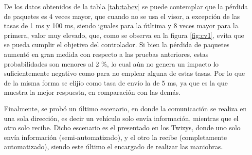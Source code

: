 \begin{table}[htbp]
  \centering
{}%
  \caption{Prueba del sistema de comunicación a distintas tasas de envío empleando el Visor 3D}
  \label{tab:tabcv}%
\end{table}%

\par De los datos obtenidos de la tabla \ref{tab:tabcv} se puede contemplar que la pérdida de paquetes es 4 veces mayor, que cuando no se usa el visor, a excepción de las tasas de 1 ms y 100 ms, siendo iguales para la útltima y 8 veces mayor para la primera, valor muy elevado, que, como se observa en la figura \ref{fig:cv1}, evita que se pueda cumplir el objetivo del controlador. Si bien la pérdida de paquetes aumentó en gran medida con respecto a las pruebas anteriores, estas probabilidades son menores al 2 \%, lo cual aún no genera un impacto lo suficientemente negativo como para no emplear alguna de estas tasas. Por lo que de la misma forma se elijío como tasa de envío la de 5 ms, ya que es la que muestra la mejor respuesta, en comparación con las demás. \\ 

\par Finalmente, se probó un último escenario, en donde la comunicación se realiza en una sola dirección, es decir un vehículo solo envía información, mientras que el otro solo recibe. Dicho escenario es el presentado en los Twizys, donde uno solo envía información (semi-automatizado), y el otro la recibe (completamente automatizado), siendo este último el encargado de realizar las maniobras. \\  

